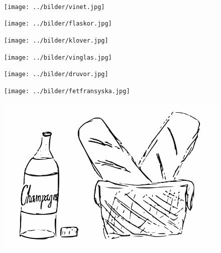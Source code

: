 $  $%
%

\begin{figure}[!b]
\begin{center}
\texttt{[image: ../bilder/vinet.jpg]} 
\end{center}
\end{figure}
\clearpage

\clearpage

\clearpage

\begin{figure}[!b]
\begin{center}
\texttt{[image: ../bilder/flaskor.jpg]} 
\end{center}
\end{figure}
\clearpage

%
\begin{figure}[!b]
\begin{center}
\texttt{[image: ../bilder/klover.jpg]} 
\end{center}
\end{figure}
\clearpage

\begin{figure}[!b]
\begin{center}
\texttt{[image: ../bilder/vinglas.jpg]} 
\end{center}
\end{figure}
\clearpage

\clearpage

\clearpage

%
\clearpage

\begin{figure}[!b]
\begin{center}
\texttt{[image: ../bilder/druvor.jpg]} 
\end{center}
\end{figure}
\clearpage

\begin{figure}[!b]
\begin{center}
\texttt{[image: ../bilder/fetfransyska.jpg]} 
\end{center}
\end{figure}
\clearpage
%

\clearpage
\begin{figure}[!b]
\begin{center}
\includegraphics[scale=0.5]{../bilder/batongochvin.png} 
\end{center}
\end{figure}

